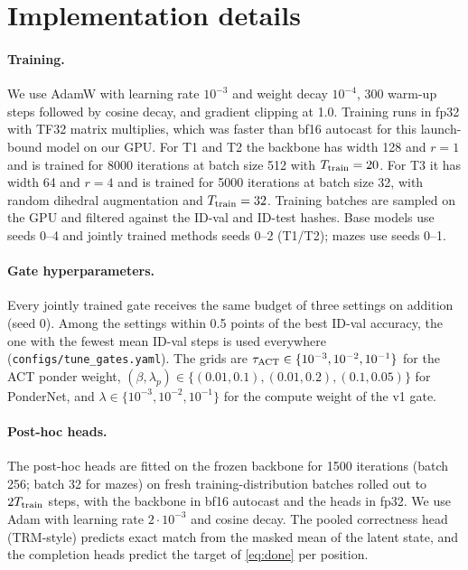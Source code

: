 \section{Implementation details}
\label{app:details}

\paragraph{Training.} We use AdamW with learning rate $10^{-3}$ and weight decay $10^{-4}$, 300 warm-up
steps followed by cosine decay, and gradient clipping at 1.0. Training runs in fp32 with TF32 matrix
multiplies, which was faster than bf16 autocast for this launch-bound model on our GPU. For T1 and T2 the
backbone has width 128 and $r=1$ and is trained for 8000 iterations at batch size 512 with
$T_{\mathrm{train}}=20$. For T3 it has width 64 and $r=4$ and is trained for 5000 iterations at batch size 32, with
random dihedral augmentation and $T_{\mathrm{train}}=32$. Training batches are sampled on the GPU and filtered
against the ID-val and ID-test hashes. Base models use seeds 0--4 and jointly trained methods seeds 0--2
(T1/T2); mazes use seeds 0--1.

\paragraph{Gate hyperparameters.} Every jointly trained gate receives the same budget of three settings
on addition (seed 0). Among the settings within 0.5 points of the best ID-val accuracy, the one with the
fewest mean ID-val steps is used everywhere (\texttt{configs/tune\_gates.yaml}). The grids are
$\tau_{\mathrm{ACT}}\in\{10^{-3},10^{-2},10^{-1}\}$ for the ACT ponder weight,
$(\beta,\lambda_p)\in\{(0.01,0.1),(0.01,0.2),(0.1,0.05)\}$ for PonderNet, and
$\lambda\in\{10^{-3},10^{-2},10^{-1}\}$ for the compute weight of the v1 gate.

\paragraph{Post-hoc heads.} The post-hoc heads are fitted on the frozen backbone for 1500 iterations
(batch 256; batch 32 for mazes) on fresh training-distribution batches rolled out to $2T_{\mathrm{train}}$ steps,
with the backbone in bf16 autocast and the heads in fp32. We use Adam with learning rate
$2\cdot 10^{-3}$ and cosine decay. The pooled correctness head (TRM-style) predicts exact match from the
masked mean of the latent state, and the completion heads predict the target of \cref{eq:done} per
position.

